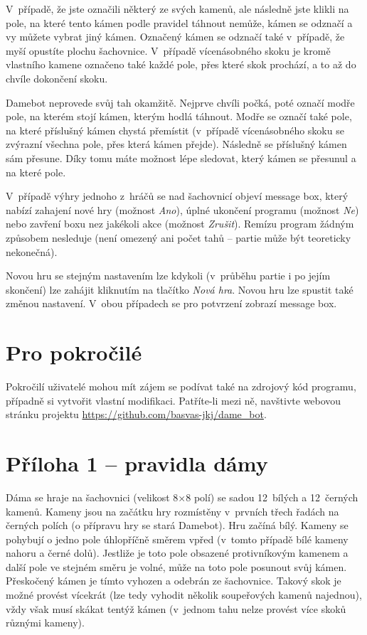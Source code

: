 \documentclass[a4paper,12pt]{article}
\newcommand{\priloha}[1]{\section*{#1}\addcontentsline{toc}{section}{#1}}
\begin{document}
	V~případě, že jste označili některý ze svých kamenů, ale následně jste klikli na pole, na které tento kámen podle pravidel táhnout nemůže, kámen se odznačí a vy můžete vybrat jiný kámen.  Označený kámen se odznačí také v~případě, že myší opustíte plochu šachovnice.
	V~případě vícenásobného skoku je kromě vlastního kamene označeno také každé pole, přes které skok prochází, a to až do chvíle dokončení skoku.
	
	Damebot neprovede svůj tah okamžitě. Nejprve chvíli počká, poté označí modře pole, na kterém stojí kámen, kterým hodlá
	táhnout. Modře se označí také pole, na které příslušný kámen chystá přemístit (v~případě vícenásobného skoku se
	zvýrazní všechna pole, přes která kámen přejde). Následně se příslušný kámen sám přesune. Díky tomu máte možnost lépe sledovat, který kámen se přesunul a na které pole.
	
	V~případě výhry jednoho z~hráčů se nad šachovnicí objeví message box, který nabízí zahajení nové hry (možnost \textit{Ano}),  úplné ukončení programu (možnost \textit{Ne}) nebo zavření boxu nez jakékoli akce (možnost \textit{Zrušit}). Remízu program žádným způsobem nesleduje (není omezený ani počet tahů -- partie může být teoreticky nekonečná).
	
	Novou hru se stejným nastavením lze kdykoli (v~průběhu partie i po jejím skončení) lze zahájit kliknutím na tlačítko \textit{Nová hra}. Novou hru lze spustit také změnou nastavení. V~obou případech se pro potvrzení zobrazí message box.
	
	\section{Pro pokročilé}
	Pokročilí uživatelé mohou mít zájem se podívat také na zdrojový kód programu, případně si vytvořit vlastní modifikaci.
	Patříte-li mezi ně, navštivte webovou stránku projektu \url{https://github.com/basvas-jkj/dame_bot}.
	
	\priloha{Příloha 1 -- pravidla dámy}
	Dáma se hraje na šachovnici (velikost 8×8 polí) se sadou 12~bílých a 12~černých kamenů. Kameny jsou na začátku hry
	rozmístěny v~prvních třech řadách na černých polích (o přípravu hry se stará Damebot). Hru začíná bílý. Kameny se
	pohybují o jedno pole úhlopříčně směrem vpřed (v~tomto případě bílé kameny nahoru a černé dolů). Jestliže je toto
	pole obsazené protivníkovým kamenem a další pole ve stejném směru je volné, může na toto pole posunout svůj kámen.
	Přeskočený kámen je tímto vyhozen a odebrán ze šachovnice. Takový skok je možné provést vícekrát (lze tedy vyhodit
	několik soupeřových kamenů najednou), vždy však musí skákat tentýž kámen (v~jednom tahu nelze provést více skoků
	různými kameny).
	
\end{document}
